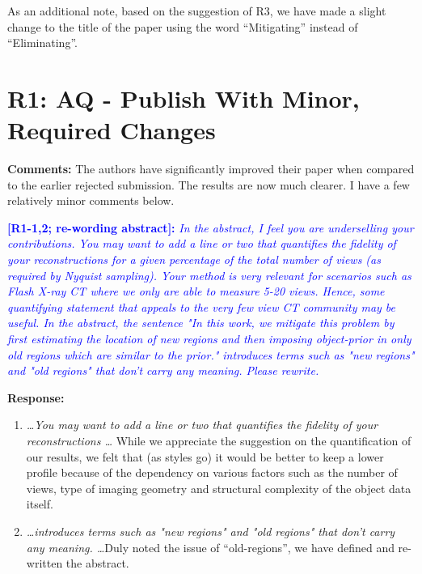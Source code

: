 \documentclass[11pt]{article}
\begin{document}
  As an additional note, based on the suggestion of R3, we have made a
  slight change to the title of the paper using the word
  ``Mitigating'' instead of ``Eliminating''.
  
  \section{R1: AQ - Publish With Minor, Required
    Changes} 

  \textbf{Comments:} The authors have significantly improved their
  paper when compared to the earlier rejected submission. The results
  are now much clearer. I have a few relatively minor comments below.

  \vspace{0.5cm}\textcolor{blue}{\textbf{[R1-1,2; re-wording abstract]:} \textit{In
      the abstract, I feel you are underselling your
      contributions. You may want to add a line or two that quantifies
      the fidelity of your reconstructions for a given percentage of
      the total number of views (as required by Nyquist
      sampling). Your method is very relevant for scenarios such as
      Flash X-ray CT where we only are able to measure 5-20
      views. Hence, some quantifying statement that appeals to the
      very few view CT community may be useful. In the abstract, the
      sentence "In this work, we mitigate this problem by first
      estimating the location of new regions and then imposing
      object-prior in only old regions which are similar to the
      prior." introduces terms such as "new regions" and "old regions"
      that don't carry any meaning. Please rewrite.}}

  \textbf{Response:}

  
\begin{enumerate}

  \item \emph {\ldots You may want to add a line or two that quantifies
      the fidelity of your reconstructions \ldots} While we appreciate the suggestion on the quantification of our
  results, we felt that (as styles go) it would be better to keep a
  lower profile because of the dependency on various factors such as
  the number of views, type of imaging geometry and structural complexity of the object data
  itself.
\item \emph{ \ldots introduces terms such as "new regions" and "old regions"
      that don't carry any meaning. \ldots }Duly noted the issue of ``old-regions'', we have defined and
  re-written the  abstract. 


  \end{enumerate}
\end{document}
